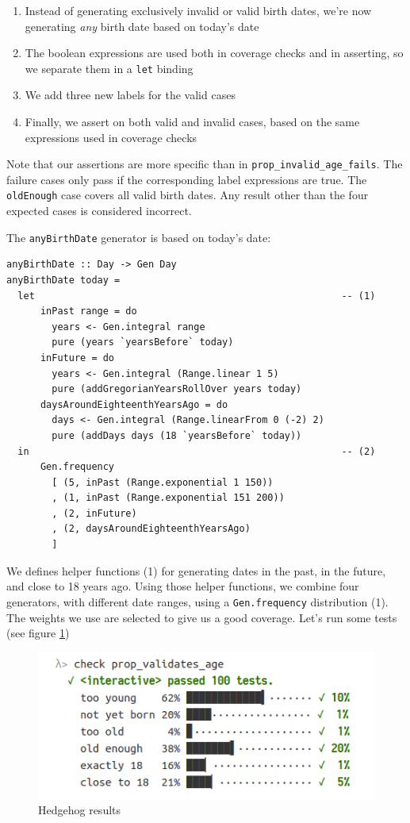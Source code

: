 \begin{enumerate}
\def\labelenumi{\arabic{enumi}.}

\item
  Instead of generating exclusively invalid or valid birth dates, we're
  now generating \emph{any} birth date based on today's date
\item
  The boolean expressions are used both in coverage checks and in
  asserting, so we separate them in a \texttt{let} binding
\item
  We add three new labels for the valid cases
\item
  Finally, we assert on both valid and invalid cases, based on the same
  expressions used in coverage checks
\end{enumerate}
Note that our assertions are more specific than in
\texttt{prop\_invalid\_age\_fails}. The failure cases only pass if the
corresponding label expressions are true. The \texttt{oldEnough} case
covers all valid birth dates. Any result other than the four expected
cases is considered incorrect.

The \texttt{anyBirthDate} generator is based on today's date:

\begin{verbatim}
anyBirthDate :: Day -> Gen Day
anyBirthDate today =
  let                                                      -- (1)
      inPast range = do   
        years <- Gen.integral range
        pure (years `yearsBefore` today)
      inFuture = do
        years <- Gen.integral (Range.linear 1 5)
        pure (addGregorianYearsRollOver years today)
      daysAroundEighteenthYearsAgo = do
        days <- Gen.integral (Range.linearFrom 0 (-2) 2)
        pure (addDays days (18 `yearsBefore` today))
  in                                                       -- (2)
      Gen.frequency
        [ (5, inPast (Range.exponential 1 150))
        , (1, inPast (Range.exponential 151 200))
        , (2, inFuture)
        , (2, daysAroundEighteenthYearsAgo)
        ]
\end{verbatim}
We defines helper functions (1) for generating dates in the past, in the
future, and close to 18 years ago. Using those helper functions, we
combine four generators, with different date ranges, using a
\texttt{Gen.frequency} distribution (1). The weights we use are selected
to give us a good coverage.
Let's run some tests (see figure \ref{fig:hedgehog5})
\begin{figure}[htbp]
 \centering
 \includegraphics[width=.95\linewidth]{./pics/hedgehog5.png}
 \caption{Hedgehog results}
 \label{fig:hedgehog5}
\end{figure}

